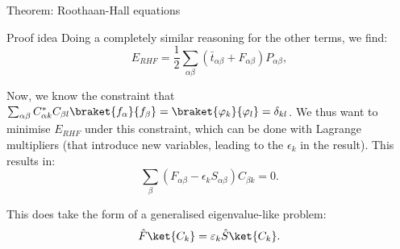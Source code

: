 \documentclass[a4paper]{article}
\begin{document}
\begin{parag}{Theorem: Roothaan-Hall equations}
\begin{subparag}{Proof idea}
        Doing a completely similar reasoning for the other terms, we find:
        \[E_{RHF} = \frac{1}{2} \sum_{\alpha \beta} \left(\bar{t}_{\alpha \beta} + F_{\alpha \beta}\right) P_{\alpha \beta},\]
        
        Now, we know the constraint that $\sum_{\alpha \beta} C_{\alpha k}^* C_{\beta l} \braket{f_{\alpha}}{f_{\beta}}  = \braket{\phi_k}{\phi_l} = \delta_{kl}$. We thus want to minimise $E_{RHF}$ under this constraint, which can be done with Lagrange multipliers (that introduce new variables, leading to the $\epsilon_k$ in the result). This results in:
        \[\sum_{\beta} \left(F_{\alpha \beta} - \epsilon_k S_{\alpha \beta}\right) C_{\beta k} = 0.\]
        
        This does take the form of a generalised eigenvalue-like problem:
        \[\hat{F} \ket{C_k} = \epsilon_k \hat{S} \ket{C_k}.\]
    \end{subparag}
\end{parag}
\end{document}
